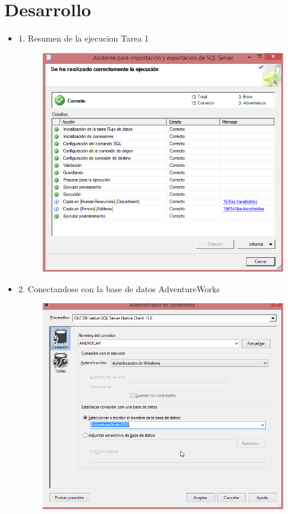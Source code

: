 \section{Desarrollo} 
\begin{itemize}

	\item 1. Resumen de la ejecucion Tarea 1
		\begin{figure}[H]
		\begin{center}
		\includegraphics[width=18cm]{./Imagenes/imagen1}
		\end{center}
		\end{figure}

     	\item2. Conectandose con la base de datos AdventureWorks 
		\begin{figure}[H]
		\begin{center}
		\includegraphics[width=18cm]{./Imagenes/imagen2}
		\end{center}
		\end{figure}
     


\end{itemize}
